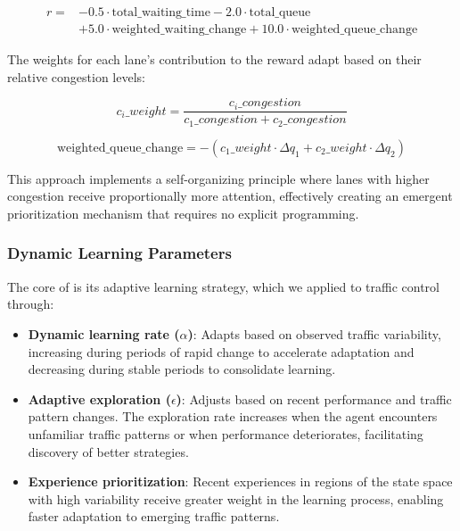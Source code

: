 \begin{equation}
\begin{split}
r = &-0.5 \cdot \text{total\_waiting\_time} - 2.0 \cdot \text{total\_queue} \\
    &+ 5.0 \cdot \text{weighted\_waiting\_change} + 10.0 \cdot \text{weighted\_queue\_change}
\end{split}
\end{equation}

The weights for each lane's contribution to the reward adapt based on their relative congestion levels:

\begin{equation}
c_i\_weight = \frac{c_i\_congestion}{c_1\_congestion + c_2\_congestion}
\end{equation}

\begin{equation}
\text{weighted\_queue\_change} = -(c_1\_weight \cdot \Delta q_1 + c_2\_weight \cdot \Delta q_2)
\end{equation}

This approach implements a self-organizing principle where lanes with higher congestion receive proportionally more attention, effectively creating an emergent prioritization mechanism that requires no explicit programming.

\subsubsection{Dynamic Learning Parameters}

The core of \adaptiverl is its adaptive learning strategy, which we applied to traffic control through:

\begin{itemize}
    \item \textbf{Dynamic learning rate ($\alpha$)}: Adapts based on observed traffic variability, increasing during periods of rapid change to accelerate adaptation and decreasing during stable periods to consolidate learning.
    
    \item \textbf{Adaptive exploration ($\epsilon$)}: Adjusts based on recent performance and traffic pattern changes. The exploration rate increases when the agent encounters unfamiliar traffic patterns or when performance deteriorates, facilitating discovery of better strategies.
    
    \item \textbf{Experience prioritization}: Recent experiences in regions of the state space with high variability receive greater weight in the learning process, enabling faster adaptation to emerging traffic patterns.
\end{itemize}

